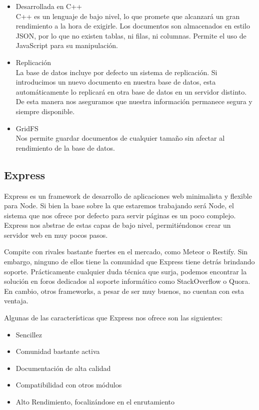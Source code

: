 \begin{itemize}
\item Desarrollada en C++ \\ C++ es un lenguaje de bajo nivel, lo que promete que alcanzará un gran rendimiento a la hora de exigirle. Los documentos son almacenados en estilo \ac{JSON}, por lo que no existen tablas, ni filas, ni columnas. Permite el uso de JavaScript para su manipulación.
\item Replicación \\ La base de datos incluye por defecto un sistema de replicación. Si introducimos un nuevo documento en nuestra base de datos, esta automáticamente lo replicará en otra base de datos en un servidor distinto. De esta manera nos aseguramos que nuestra información permanece segura y siempre disponible.
\item GridFS \\ Nos permite guardar documentos de cualquier tamaño sin afectar al rendimiento de la base de datos.
\end{itemize}

\subsection{Express}
Express es un framework de desarrollo de aplicaciones web minimalista y flexible para Node. Si bien la base sobre la que estaremos trabajando será Node, el sistema que nos ofrece por defecto para servir páginas es un poco complejo. Express nos abstrae de estas capas de bajo nivel, permitiéndonos crear un servidor web en muy pocos pasos.

Compite con rivales bastante fuertes en el mercado, como Meteor o Restify. Sin embargo, ninguno de ellos tiene la comunidad que Express tiene detrás brindando soporte. Prácticamente cualquier duda técnica que surja, podemos encontrar la solución en foros dedicados al soporte informático como StackOverflow o Quora. En cambio, otros frameworks, a pesar de ser muy buenos, no cuentan con esta ventaja.

Algunas de las características que Express nos ofrece son las siguientes:

\begin{itemize}
\item Sencillez
\item Comunidad bastante activa
\item Documentación de alta calidad
\item Compatibilidad con otros módulos
\item Alto Rendimiento, focalizándose en el enrutamiento
\end{itemize}

